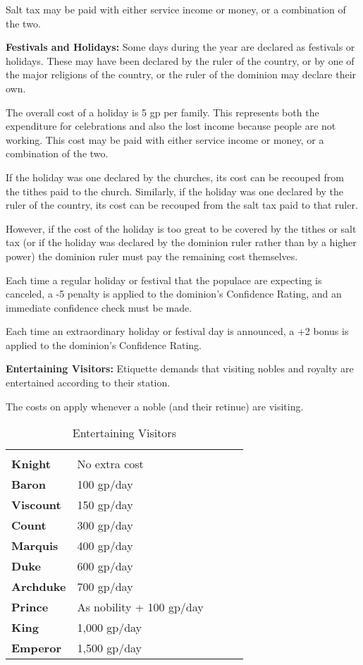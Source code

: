 \begin{multicols*}{2}
Salt tax may be paid with either service income or money, or a combination of the two.

\textbf{Festivals and Holidays:} Some days during the year are declared as festivals or holidays. These may have been declared by the ruler of the country, or by one of the major religions of the country, or the ruler of the dominion may declare their own.

The overall cost of a holiday is 5 gp per family. This represents both the expenditure for celebrations and also the lost income because people are not working. This cost may be paid with either service income or money, or a combination of the two.

If the holiday was one declared by the churches, its cost can be recouped from the tithes paid to the church. Similarly, if the holiday was one declared by the ruler of the country, its cost can be recouped from the salt tax paid to that ruler.

However, if the cost of the holiday is too great to be covered by the tithes or salt tax (or if the holiday was declared by the dominion ruler rather than by a higher power) the dominion ruler must pay the remaining cost themselves.

Each time a regular holiday or festival that the populace are expecting is canceled, a -5 penalty is applied to the dominion’s Confidence Rating, and an immediate confidence check must be made.

Each time an extraordinary holiday or festival day is announced, a +2 bonus is applied to the dominion’s Confidence Rating.

\textbf{Entertaining Visitors:} Etiquette demands that visiting nobles and royalty are entertained according to their station.

The costs on  apply whenever a noble (and their retinue) are visiting.

\begin {table}[H]
  \caption{Entertaining Visitors}\label{tab:Entertaining Visitors}
  \begin{tabularx}{\columnwidth}{>{\bfseries}YYYYY}
	 & \\
	Knight & No extra cost\\
	Baron & 100 gp/day\\
	Viscount & 150 gp/day\\
	Count & 300 gp/day\\
	Marquis & 400 gp/day\\
	Duke & 600 gp/day\\
	Archduke & 700 gp/day\\
	Prince & As nobility + 100 gp/day\\
	King & 1,000 gp/day\\
	Emperor & 1,500 gp/day
  \end {tabularx}
\end {table}


\end{multicols*}
